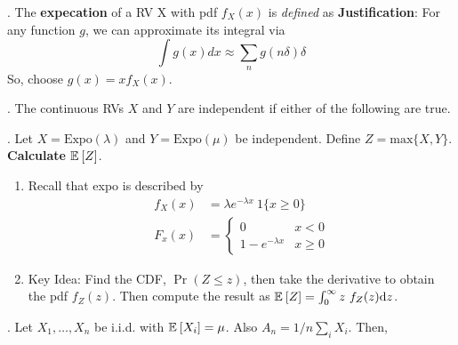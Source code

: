 \documentclass[12pt]{article}
\newcommand{\myspace}{\vspace{2\bigskipamount}}
\newcommand\p{\Needspace{12\baselineskip} \noindent}
\begin{document}
\myspace
\p {}. The \textbf{expecation} of a RV X with pdf $f_X(x)$ is \textit{defined} as 
\textbf{Justification}: For any function $g$, we can approximate its integral via $$\int g(x)dx \approx \sum_n g(n\delta)\delta$$ So, choose $g(x) = x f_X(x)$. \purple{[23:00]}


\myspace
\p {}. The continuous RVs $X$ and $Y$ are independent if either of the following are true.





\myspace
\p {}. Let $X = \mathrm{Expo}(\lambda)$ and $Y = \mathrm{Expo}(\mu)$ be independent. Define $Z = \mathrm{max}\{X, Y\}$. \textbf{Calculate} $\mathbb{E}_{}\left[Z\right]$. 
\begin{enumerate}
	\item Recall that expo is described by 
	\begin{align}
	f_X(x) &= \lambda e^{-\lambda x} ~ 1\{x \ge 0 \} \\
	F_x(x) &= \begin{cases} 0 &  x < 0 \\ 1 - e^{-\lambda x} & x \ge 0 \end{cases}
	\end{align}
	
	\item Key Idea: Find the CDF, $\Pr(Z \le z)$, then take the derivative to obtain the pdf $f_Z(z)$. Then compute the result as $\mathbb{E}_{}\left[Z\right] = \int_{0}^{\infty} z ~ f_Z(z) \mathrm{d}{z}$. 
\end{enumerate}

\myspace
\p {}. Let $X_1, \ldots, X_n$ be i.i.d. with $\mathbb{E}_{}\left[X_i\right] = \mu$. Also $A_n = 1/n \sum_i X_i$. Then,
\end{document}
